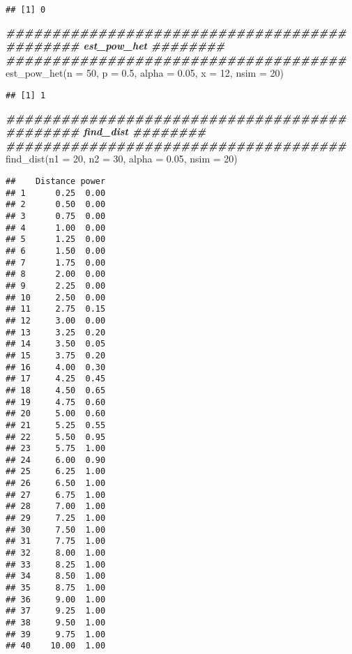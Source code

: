 \documentclass[
]{article}
\newenvironment{Shaded}{\begin{snugshade}}{\end{snugshade}}
\newcommand{\AttributeTok}[1]{\textcolor[rgb]{0.77,0.63,0.00}{#1}}
\newcommand{\DecValTok}[1]{\textcolor[rgb]{0.00,0.00,0.81}{#1}}
\newcommand{\DocumentationTok}[1]{\textcolor[rgb]{0.56,0.35,0.01}{\textbf{\textit{#1}}}}
\newcommand{\FloatTok}[1]{\textcolor[rgb]{0.00,0.00,0.81}{#1}}
\newcommand{\FunctionTok}[1]{\textcolor[rgb]{0.00,0.00,0.00}{#1}}
\newcommand{\NormalTok}[1]{#1}
\begin{document}
\begin{verbatim}
## [1] 0
\end{verbatim}

\begin{Shaded}
\begin{Highlighting}[]
\DocumentationTok{\#\#\#\#\#\#\#\#\#\#\#\#\#\#\#\#\#\#\#\#\#\#\#\#\#\#\#\#\#\#\#\#\#\#\#\#\#}
\DocumentationTok{\#\#\#\#\#\#\#\# est\_pow\_het \#\#\#\#\#\#\#\#}
\DocumentationTok{\#\#\#\#\#\#\#\#\#\#\#\#\#\#\#\#\#\#\#\#\#\#\#\#\#\#\#\#\#\#\#\#\#\#\#\#\#}
\FunctionTok{est\_pow\_het}\NormalTok{(}\AttributeTok{n =} \DecValTok{50}\NormalTok{, }\AttributeTok{p =} \FloatTok{0.5}\NormalTok{, }\AttributeTok{alpha =} \FloatTok{0.05}\NormalTok{, }\AttributeTok{x =} \DecValTok{12}\NormalTok{, }\AttributeTok{nsim =} \DecValTok{20}\NormalTok{)}
\end{Highlighting}
\end{Shaded}

\begin{verbatim}
## [1] 1
\end{verbatim}

\begin{Shaded}
\begin{Highlighting}[]
\DocumentationTok{\#\#\#\#\#\#\#\#\#\#\#\#\#\#\#\#\#\#\#\#\#\#\#\#\#\#\#\#\#\#\#\#\#\#\#\#\#}
\DocumentationTok{\#\#\#\#\#\#\#\# find\_dist \#\#\#\#\#\#\#\#}
\DocumentationTok{\#\#\#\#\#\#\#\#\#\#\#\#\#\#\#\#\#\#\#\#\#\#\#\#\#\#\#\#\#\#\#\#\#\#\#\#\#}
\FunctionTok{find\_dist}\NormalTok{(}\AttributeTok{n1 =} \DecValTok{20}\NormalTok{, }\AttributeTok{n2 =} \DecValTok{30}\NormalTok{, }\AttributeTok{alpha =} \FloatTok{0.05}\NormalTok{, }\AttributeTok{nsim =} \DecValTok{20}\NormalTok{)}
\end{Highlighting}
\end{Shaded}

\begin{verbatim}
##    Distance power
## 1      0.25  0.00
## 2      0.50  0.00
## 3      0.75  0.00
## 4      1.00  0.00
## 5      1.25  0.00
## 6      1.50  0.00
## 7      1.75  0.00
## 8      2.00  0.00
## 9      2.25  0.00
## 10     2.50  0.00
## 11     2.75  0.15
## 12     3.00  0.00
## 13     3.25  0.20
## 14     3.50  0.05
## 15     3.75  0.20
## 16     4.00  0.30
## 17     4.25  0.45
## 18     4.50  0.65
## 19     4.75  0.60
## 20     5.00  0.60
## 21     5.25  0.55
## 22     5.50  0.95
## 23     5.75  1.00
## 24     6.00  0.90
## 25     6.25  1.00
## 26     6.50  1.00
## 27     6.75  1.00
## 28     7.00  1.00
## 29     7.25  1.00
## 30     7.50  1.00
## 31     7.75  1.00
## 32     8.00  1.00
## 33     8.25  1.00
## 34     8.50  1.00
## 35     8.75  1.00
## 36     9.00  1.00
## 37     9.25  1.00
## 38     9.50  1.00
## 39     9.75  1.00
## 40    10.00  1.00
\end{verbatim}
\end{document}
